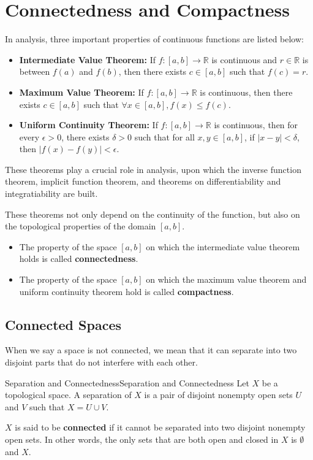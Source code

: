 \documentclass[../main.tex]{subfiles}
\begin{document}
\chapter{Connectedness and Compactness}

In analysis, three important properties of continuous functions are listed below:
\begin{itemize}
	\item \textbf{Intermediate Value Theorem:} If $f: [a,b] \rightarrow \mathbb{R}$ is continuous and $r\in \mathbb{R}$ is between $f(a)$ and $f(b)$, then there exists $c\in [a,b]$ such that $f(c) = r$.
	\item \textbf{Maximum Value Theorem:} If $f: [a,b] \rightarrow \mathbb{R}$ is continuous, then there exists $c\in [a,b]$ such that $\forall x\in [a,b], f(x) \leq f(c)$.
	\item \textbf{Uniform Continuity Theorem:} If $f: [a,b] \rightarrow \mathbb{R}$ is continuous, then for every $\epsilon > 0$, there exists $\delta > 0$ such that for all $x,y\in [a,b]$, if $|x-y| < \delta$, then $|f(x) - f(y)| < \epsilon$.
\end{itemize}

These theorems play a crucial role in analysis, upon which the inverse function theorem, implicit function theorem, and theorems on differentiability and integratiability are built.

These theorems not only depend on the continuity of the function, but also on the topological properties of the domain $[a,b]$.

\begin{itemize}
\item The property of the space $[a,b]$ on which the intermediate value theorem holds is called \textbf{connectedness}.
\item The property of the space $[a,b]$ on which the maximum value theorem and uniform continuity theorem hold is called \textbf{compactness}.
\end{itemize}


\section{Connected Spaces}

When we say a space is not connected, we mean that it can separate into two disjoint parts that do not interfere with each other.

\begin{definition}{Separation and Connectedness}{Separation and Connectedness}
Let $X$ be a topological space. A separation of $X$ is a pair of disjoint nonempty open sets $U$ and $V$ such that $X = U \cup V$.

$X$ is said to be \textbf{connected} if it cannot be separated into two disjoint nonempty open sets. In other words, the only sets that are both open and closed in $X$ is $\emptyset $ and $X$.
\end{definition}
\end{document}
